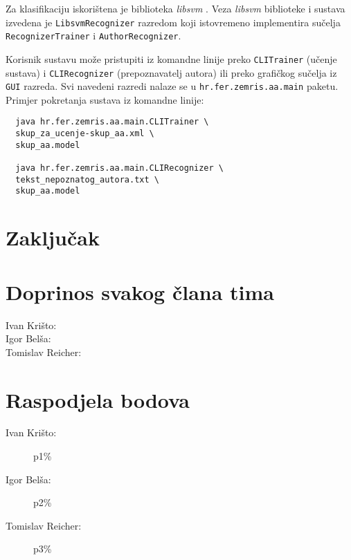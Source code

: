 \documentclass{article}
\begin{document}

Za klasifikaciju iskorištena je biblioteka \emph{libsvm} \citep{CC01a}. Veza
\emph{libsvm} biblioteke i sustava izvedena je \texttt{LibsvmRecognizer}
razredom koji istovremeno implementira sučelja \texttt{RecognizerTrainer} i
\texttt{AuthorRecognizer}.

Korisnik sustavu može pristupiti iz komandne linije preko \texttt{CLITrainer}
(učenje sustava) i \texttt{CLIRecognizer} (prepoznavatelj autora) ili preko
grafičkog sučelja iz \texttt{GUI} razreda. Svi navedeni razredi nalaze se u
\texttt{hr.fer.zemris.aa.main} paketu. Primjer pokretanja sustava iz
komandne linije:
\begin{verbatim}
  java hr.fer.zemris.aa.main.CLITrainer \
  skup_za_ucenje-skup_aa.xml \
  skup_aa.model
  
  java hr.fer.zemris.aa.main.CLIRecognizer \
  tekst_nepoznatog_autora.txt \
  skup_aa.model
\end{verbatim}


\section{Zaključak}





\newpage
\appendix
\section{Doprinos svakog člana tima}
\begin{description}
\item[Ivan Krišto:]
\item[Igor Belša:]
\item[Tomislav Reicher:]
\end{description}

\section{Raspodjela bodova}
\begin{description}
\item[Ivan Krišto:] p1\%
\item[Igor Belša:] p2\%
\item[Tomislav Reicher:] p3\%
\end{description}
\end{document}

